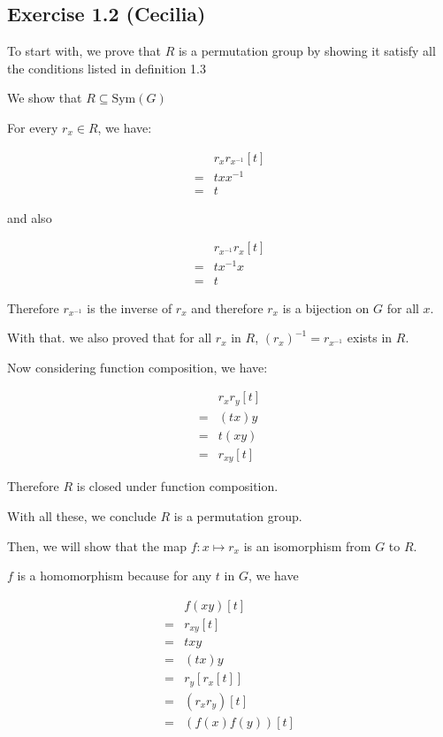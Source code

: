 \subsection*{Exercise 1.2 (Cecilia)}

To start with, we prove that $R$ is a permutation group by showing it satisfy all the conditions listed in definition 1.3

We show that $R \subseteq \text{Sym}(G)$

For every $ r_x \in R$, we have:

\begin{align*}
   & r_x r_{x^{-1}} [t] \\
  =& txx^{-1}           \\
  =& t
\end{align*}

and also

\begin{align*}
   & r_{x^{-1}} r_x [t] \\
  =& tx^{-1}x           \\
  =& t
\end{align*}

Therefore $r_{x^{-1}}$ is the inverse of $r_x$ and therefore $r_x$ is a bijection on $G$ for all $x$.

With that. we also proved that for all $r_x$ in $R$, $(r_x)^{-1} = r_{x^{-1}} $ exists in $R$.

Now considering function composition, we have:

\begin{align*}
   & r_x r_y [t] \\
  =& (tx)y       \\
  =& t(xy)       \\
  =& r_{xy} [t]
\end{align*}

Therefore $R$ is closed under function composition. 

With all these, we conclude $ R $ is a permutation group.

Then, we will show that the map $f: x \mapsto r_x$ is an isomorphism from $G$ to $R$.

$f$ is a homomorphism because for any $t$ in $G$, we have

\begin{align*}
   & f(xy)[t]       \\
  =& r_{xy}[t]      \\
  =& txy            \\
  =& (tx)y          \\
  =& r_y [r_x[t]]   \\
  =& (r_x r_y)[t]   \\
  =& (f(x) f(y))[t]
\end{align*}

